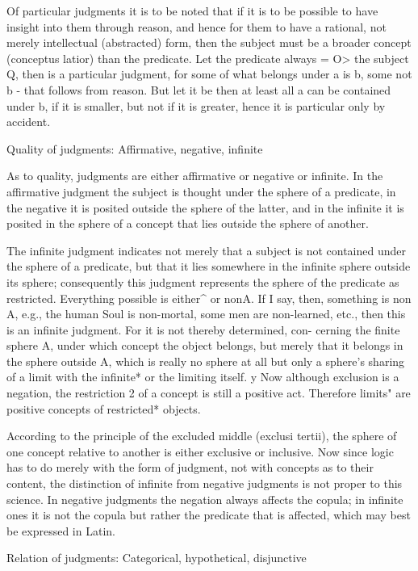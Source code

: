     Of particular judgments it is to be noted that if it is to be possible to have
    insight into them through reason, and hence for them to have a rational,
    not merely intellectual (abstracted) form, then the subject must be a
    broader concept (conceptus latior) than the predicate. Let the predicate
    always = O> the subject Q, then
    is a particular judgment, for some of what belongs under a is b, some not
    b - that follows from reason. But let it be
    then at least all a can be contained under b, if it is smaller, but not if it is
    greater, hence it is particular only by accident.

Quality of judgments: Affirmative, negative, infinite

As to quality, judgments are either affirmative or negative or infinite.
In the affirmative judgment the subject is thought under the sphere of a predicate,
in the negative it is posited outside the sphere of the latter, and
in the infinite it is posited in the sphere of a concept that lies outside
the sphere of another.

The infinite judgment indicates not merely that a subject is not contained
under the sphere of a predicate, but that it lies somewhere in the infinite
sphere outside its sphere; consequently this judgment represents the
sphere of the predicate as restricted.
Everything possible is either^ or nonA. If I say, then, something is non
A, e.g., the human Soul is non-mortal, some men are non-learned, etc.,
then this is an infinite judgment. For it is not thereby determined, con-
cerning the finite sphere A, under which concept the object belongs, but
merely that it belongs in the sphere outside A, which is really no sphere at
all but only a sphere's sharing of a limit with the infinite* or the limiting
itself. y Now although exclusion is a negation, the restriction 2 of a concept
is still a positive act. Therefore limits" are positive concepts of restricted*
objects.

According to the principle of the excluded middle (exclusi tertii),
the sphere of one concept relative to another is either exclusive or inclusive.
Now since logic has to do merely with the form of judgment,
not with concepts as to their content,
the distinction of infinite from negative judgments is
not proper to this science.
In negative judgments the negation always affects the copula;
in infinite ones it is not the copula but rather the predicate that is affected,
which may best be expressed in Latin.

Relation of judgments: Categorical, hypothetical, disjunctive

